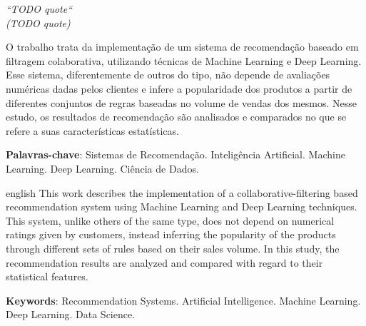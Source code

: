 \documentclass[
	12pt,	%
	openright,			%
	oneside,            %
	a4paper,			%
	english,			%
	french,				%
	spanish,			%
	brazil				%
]{abntex2}
\begin{document}
\begin{epigrafe}
    \vspace*{\fill}
	\begin{flushright}
		\textit{``TODO quote``\\
		(TODO quote)}
	\end{flushright}
\end{epigrafe}


\setlength{\absparsep}{18pt} 
\begin{resumo}

O trabalho trata da implementação de um sistema de recomendação baseado em filtragem colaborativa, utilizando técnicas de Machine Learning e Deep Learning. Esse sistema, diferentemente de outros do tipo, não depende de avaliações numéricas dadas pelos clientes e infere a popularidade dos produtos a partir de diferentes conjuntos de regras baseadas no volume de vendas dos mesmos. Nesse estudo, os resultados de recomendação são analisados e comparados no que se refere a suas características estatísticas.

 \textbf{Palavras-chave}: Sistemas de Recomendação. Inteligência Artificial. Machine Learning. Deep Learning. Ciência de Dados.
\end{resumo}

\begin{resumo}[Abstract]
 \begin{otherlanguage*}{english}
This work describes the implementation of a collaborative-filtering based recommendation system using Machine Learning and Deep Learning techniques. This system, unlike others of the same type, does not depend on numerical ratings given by customers, instead inferring the popularity of the products through different sets of rules based on their sales volume. In this study, the recommendation results are analyzed and compared with regard to their statistical features.
   \vspace{\onelineskip}
 
   \noindent 
   \textbf{Keywords}: Recommendation Systems. Artificial Intelligence. Machine Learning. Deep Learning. Data Science.
 \end{otherlanguage*}
\end{resumo}

\listoffigures*
\cleardoublepage
\end{document}

